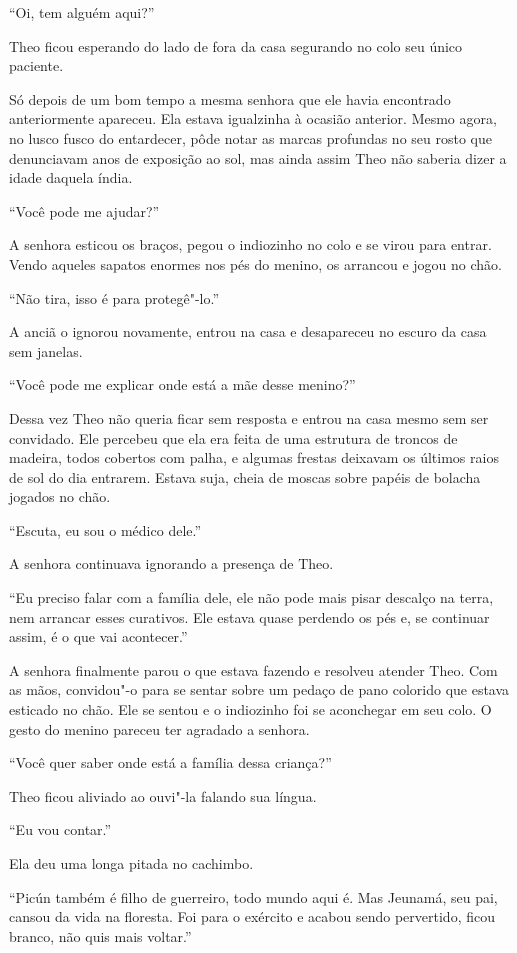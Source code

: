 ``Oi, tem alguém aqui?''

Theo ficou esperando do lado de fora da casa segurando no colo seu único
paciente.

Só depois de um bom tempo a mesma senhora que ele havia encontrado
anteriormente apareceu. Ela estava igualzinha à ocasião anterior. Mesmo
agora, no lusco fusco do entardecer, pôde notar as marcas profundas no
seu rosto que denunciavam anos de exposição ao sol, mas ainda assim Theo
não saberia dizer a idade daquela índia.

``Você pode me ajudar?''

A senhora esticou os braços, pegou o indiozinho no colo e se virou para
entrar. Vendo aqueles sapatos enormes nos pés do menino, os arrancou e
jogou no chão.

``Não tira, isso é para protegê"-lo.''

A anciã o ignorou novamente, entrou na casa e desapareceu no escuro da
casa sem janelas.

``Você pode me explicar onde está a mãe desse menino?''

Dessa vez Theo não queria ficar sem resposta e entrou na casa mesmo sem
ser convidado. Ele percebeu que ela era feita de uma estrutura de
troncos de madeira, todos cobertos com palha, e algumas frestas deixavam
os últimos raios de sol do dia entrarem. Estava suja, cheia de moscas
sobre papéis de bolacha jogados no chão.

``Escuta, eu sou o médico dele.''

A senhora continuava ignorando a presença de Theo.

``Eu preciso falar com a família dele, ele não pode mais pisar descalço
na terra, nem arrancar esses curativos. Ele estava quase perdendo os pés
e, se continuar assim, é o que vai acontecer.''

A senhora finalmente parou o que estava fazendo e resolveu atender Theo.
Com as mãos, convidou"-o para se sentar sobre um pedaço de pano colorido
que estava esticado no chão. Ele se sentou e o indiozinho foi se
aconchegar em seu colo. O gesto do menino pareceu ter agradado a
senhora.

``Você quer saber onde está a família dessa criança?''

Theo ficou aliviado ao ouvi"-la falando sua língua.

``Eu vou contar.''

Ela deu uma longa pitada no cachimbo.

``Picún também é filho de guerreiro, todo mundo aqui é. Mas Jeunamá, seu
pai, cansou da vida na floresta. Foi para o exército e acabou sendo
pervertido, ficou branco, não quis mais voltar.''

